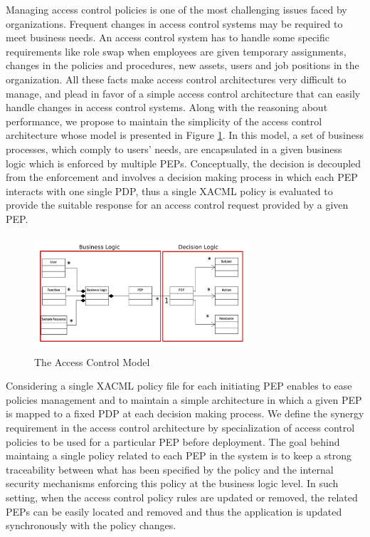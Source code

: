 Managing access control policies is one of the most challenging issues faced by organizations. 
Frequent changes in access control systems may be required to meet business needs. An access control system has to handle some specific 
requirements like role swap when employees are given temporary assignments, changes in the policies and procedures, 
new assets, users and job positions in the organization.
All these facts make access control architectures very difficult to manage, and plead in favor of a 
simple access control architecture that can easily handle changes in access control systems. 
Along with the reasoning about performance, we propose to maintain the simplicity of the access control architecture whose model 
is presented in Figure \ref{model}. In this model, a set of business processes, which comply to users' needs, are encapsulated in a given business logic 
which is enforced by multiple PEPs. Conceptually, the decision is decoupled from the enforcement and involves a decision making process in which each PEP interacts 
with one single PDP, thus a single XACML policy is evaluated to provide the suitable response for an access control request provided by a given PEP. 
\begin{figure}[!h]
\begin{center}
\includegraphics[height=4.3cm,width=8cm]{model}
\caption{The Access Control Model}
\label{model}
\end{center}
\end{figure}

Considering a single XACML policy file for each initiating PEP enables to ease policies management and to maintain a simple architecture 
in which a given PEP is mapped to a fixed PDP at each decision making process. We define the synergy requirement in the access control 
architecture by specialization of access control policies to be used for a particular PEP before deployment. The goal behind maintaing a single 
policy related to each PEP in the system is to keep a strong traceability between what has been specified by the policy and the internal 
security mechanisms enforcing this policy at the business logic level. In such setting, when the access control policy rules are updated or removed, 
the related PEPs can be easily located and removed and thus the application is updated synchronously with the policy changes. 

